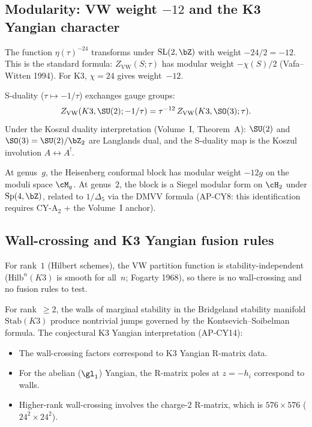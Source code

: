 \subsection{Modularity: VW weight $-12$ and the K3 Yangian character}
\label{subsec:k3e-agt-modularity}

The function $\eta(\tau)^{-24}$ transforms under $\mathrm{SL}(2, \bZ)$ with weight $-24/2 = -12$. This is the standard formula: $Z_{\mathrm{VW}}(S; \tau)$ has modular weight $-\chi(S)/2$ (Vafa--Witten 1994). For K3, $\chi = 24$ gives weight~$-12$.

S-duality ($\tau \mapsto -1/\tau$) exchanges gauge groups:
\[
  Z_{\mathrm{VW}}(K3, \SU(2); -1/\tau) = \tau^{-12} \, Z_{\mathrm{VW}}(K3, \SO(3); \tau).
\]
Under the Koszul duality interpretation (Volume~I, Theorem~A): $\SU(2)$ and $\SO(3) = \SU(2)/\bZ_2$ are Langlands dual, and the S-duality map is the Koszul involution $A \leftrightarrow A^!$.

At genus~$g$, the Heisenberg conformal block has modular weight $-12g$ on the moduli space $\cM_g$. At genus~$2$, the block is a Siegel modular form on $\cH_2$ under $\mathrm{Sp}(4, \bZ)$, related to $1/\Delta_5$ via the DMVV formula (AP-CY8: this identification requires CY-A$_2$ + the Volume~I anchor).

\subsection{Wall-crossing and K3 Yangian fusion rules}
\label{subsec:k3e-agt-wall-crossing}

For rank~$1$ (Hilbert schemes), the VW partition function is stability-independent ($\mathrm{Hilb}^n(K3)$ is smooth for all~$n$; Fogarty 1968), so there is no wall-crossing and no fusion rules to test.

For rank~$\geq 2$, the walls of marginal stability in the Bridgeland stability manifold $\mathrm{Stab}(K3)$ produce nontrivial jumps governed by the Kontsevich--Soibelman formula. The conjectural K3 Yangian interpretation (AP-CY14):
\begin{itemize}
\item The wall-crossing factors correspond to K3 Yangian R-matrix data.
\item For the abelian ($\gl_1$) Yangian, the R-matrix poles at $z = -h_i$ correspond to walls.
\item Higher-rank wall-crossing involves the charge-$2$ R-matrix, which is $576 \times 576$ ($24^2 \times 24^2$).
\end{itemize}


